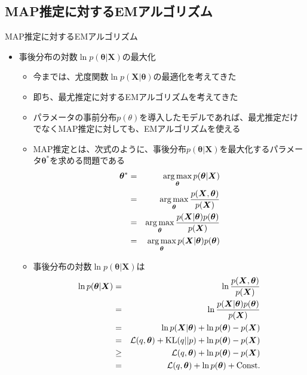 \documentclass[dvipdfmx,notheorems,t]{beamer}
\begin{document}
\subsection{MAP推定に対するEMアルゴリズム}

\begin{frame}{MAP推定に対するEMアルゴリズム}

\begin{itemize}
	\item 事後分布の対数$\ln p(\bm{\theta} | \bm{X})$の最大化
	\begin{itemize}
		\item 今までは、尤度関数$\ln p(\bm{X} | \bm{\theta})$の最適化を考えてきた
		\item 即ち、\alert{最尤推定に対するEMアルゴリズム}を考えてきた
		\newline
		\item パラメータの事前分布$p(\theta)$を導入したモデルであれば、最尤推定だけでなく\alert{MAP推定}に対しても、EMアルゴリズムを使える
		\newline
		\item MAP推定とは、次式のように、事後分布$p(\bm{\theta} | \bm{X})$を最大化するパラメータ$\bm{\theta}^*$を求める問題である
		\begin{eqnarray}
			\bm{\theta}^* &=& \operatorname*{arg\,max}_{\bm{\theta}} p(\bm{\theta} | \bm{X}) \\
			&=& \operatorname*{arg\,max}_{\bm{\theta}} \frac{p(\bm{X}, \bm{\theta})}{p(\bm{X})} \\
			&=& \operatorname*{arg\,max}_{\bm{\theta}} \frac{p(\bm{X} | \bm{\theta}) p(\bm{\theta})}{p(\bm{X})} \\
			&=& \operatorname*{arg\,max}_{\bm{\theta}} p(\bm{X} | \bm{\theta}) p(\bm{\theta})
		\end{eqnarray}
		
		\item 事後分布の対数$\ln p(\bm{\theta} | \bm{X})$は
		\begin{eqnarray}
			\ln p(\bm{\theta} | \bm{X}) &=& \ln \frac{p(\bm{X}, \bm{\theta})}{p(\bm{X})} \\
			&=& \ln \frac{p(\bm{X} | \bm{\theta}) p(\bm{\theta})}{p(\bm{X})} \nonumber \\
			&=& \ln p(\bm{X} | \bm{\theta}) + \ln p(\bm{\theta}) - p(\bm{X}) \\
			&=& \mathcal{L}(q, \bm{\theta}) + \operatorname{KL} (q || p) + \ln p(\bm{\theta}) - p(\bm{X}) \\
			&\ge& \mathcal{L}(q, \bm{\theta}) + \ln p(\bm{\theta}) - p(\bm{X}) \\
			&=& \mathcal{L}(q, \bm{\theta}) + \ln p(\bm{\theta}) + \mathrm{Const.}
		\end{eqnarray}
		

\end{itemize}
\end{itemize}
\end{frame}
\end{document}
